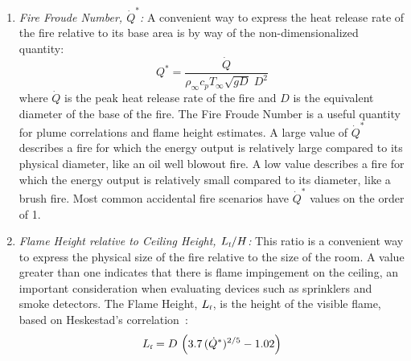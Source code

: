 \documentclass[graybox]{svmult}
\begin{document}
\begin{enumerate}
\item {\em Fire Froude Number, $\dot{Q}^*$:}
A convenient way to express the heat release rate of the fire relative to its base area is by way of the non-dimensionalized quantity:
\begin{equation}
 Q^* = \frac{\dot{Q}}{\rho_\infty c_p T_\infty \sqrt{gD} \; D^2}
\end{equation}
where $\dot{Q}$ is the peak heat release rate of the fire and $D$ is the equivalent diameter of the base of the fire.
The Fire Froude Number is a useful quantity for plume correlations and flame height estimates. A large value of $\dot{Q}^*$ describes a fire for which the energy output is relatively large compared to its physical diameter, like an oil well blowout fire.  A low value describes a fire for which the energy output is relatively small compared to its diameter, like a brush fire.  Most common accidental fire scenarios have $\dot{Q}^*$ values on the order of 1.

\item {\em Flame Height relative to Ceiling Height, $L_{\hbox{\tiny f}}/H$:}
This ratio is a convenient way to express the physical size of the fire relative to the size of the room. A value greater than
one indicates that there is flame impingement on the ceiling, an important consideration when evaluating devices such as sprinklers and smoke detectors.
The Flame Height, $L_{\hbox{\tiny f}}$, is the height of the visible flame, based on Heskestad's correlation~\cite{Heskestad:FSJ1983}:
\begin{equation}
   L_{\hbox{\tiny f}} = D \, \left( 3.7 \, (\dot{Q}^*)^{2/5} - 1.02 \right) \label{Heskestad_Flame_Height}
\end{equation}


\end{enumerate}
\end{document}
